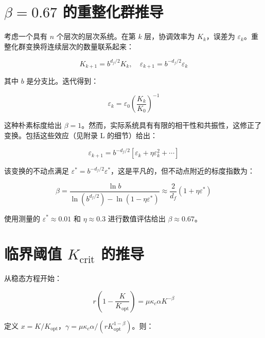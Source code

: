 \documentclass[12pt,a4paper]{article}
\theoremstyle{remark}
\newcommand{\Keffcrit}{K_{\mathrm{crit}}}
\newcommand{\kappac}{\kappa_c}
\newcommand{\eps}{\varepsilon}
\newcommand{\df}{d_{\!f}}
\begin{document}
		\section{$\beta = 0.67$ 的重整化群推导}
		\label{app:rg}
		
		考虑一个具有 $n$ 个层次的层次系统。在第 $k$ 层，协调效率为 $K_k$，误差为 $\eps_k$。重整化群变换将连续层次的数量联系起来：
		
		\begin{equation}
			K_{k+1} = b^{\df/2} K_k, \quad \eps_{k+1} = b^{-\df/2} \eps_k
			\label{eq:rg}
		\end{equation}
		
		其中 $b$ 是分支比。迭代得到：
		
		\begin{equation}
			\eps_k = \eps_0 \left( \frac{K_k}{K_0} \right)^{-1}
			\label{eq:rg-naive}
		\end{equation}
		
		这种朴素标度给出 $\beta = 1$。然而，实际系统具有有限的相干性和共振性，这修正了变换。包括这些效应（见附录 L 的细节）给出：
		
		\begin{equation}
			\eps_{k+1} = b^{-\df/2} \left[ \eps_k + \eta \eps_k^2 + \cdots \right]
			\label{eq:rg-corrected}
		\end{equation}
		
		该变换的不动点满足 $\eps^* = b^{-\df/2} \eps^*$，这是平凡的，但不动点附近的标度指数为：
		
		\begin{equation}
			\beta = \frac{\ln b}{\ln(b^{\df/2}) - \ln(1 - \eta \eps^*)} \approx \frac{2}{\df} (1 + \eta \eps^*)
			\label{eq:rg-beta}
		\end{equation}
		
		使用测量的 $\eps^* \approx 0.01$ 和 $\eta \approx 0.3$ 进行数值评估给出 $\beta \approx 0.67$。
		
		\section{临界阈值 $\Keffcrit$ 的推导}
		\label{app:Kcrit}
		
		从稳态方程开始：
		
		\begin{equation}
			r \left(1 - \frac{K}{K_{\text{opt}}}\right) = \mu \kappac \alpha K^{-\beta}
			\label{eq:stationary-app}
		\end{equation}
		
		定义 $x = K/K_{\text{opt}}$，$\gamma = \mu \kappac \alpha / (r K_{\text{opt}}^{1-\beta})$。则：
		
\end{document}
